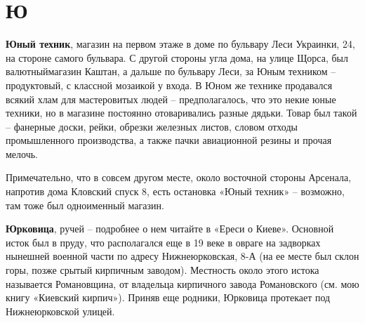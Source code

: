 \chapter*{Ю}


\textbf{Юный техник}, магазин на первом этаже в доме по бульвару Леси Украинки, 24, на стороне самого бульвара. С другой стороны угла дома, на улице Щорса, был валютныймагазин Каштан, а дальше по бульвару Леси, за Юным техником – продуктовый, с классной мозаикой у входа. В Юном же технике продавался всякий хлам для мастеровитых людей – предполагалось, что это некие юные техники, но в магазине постоянно отоваривались разные дядьки. Товар был такой – фанерные доски, рейки, обрезки железных листов, словом отходы промышленного производства, а также пачки авиационной резины и прочая мелочь.

Примечательно, что в совсем другом месте, около восточной стороны Арсенала, напротив дома Кловский спуск 8, есть остановка «Юный техник» – возможно, там тоже был одноименный магазин.\\

\medskip

\textbf{Юрковица}, ручей – подробнее о нем читайте в «Ереси о Киеве». Основной исток был в пруду, что располагался еще в 19 веке в овраге на задворках нынешней военной части по адресу Нижнеюрковская, 8-А (на ее месте был склон горы, позже срытый кирпичным заводом). Местность около этого истока называется Романовщина, от владельца кирпичного завода Романовского (см. мою книгу «Киевский кирпич»). Приняв еще родники, Юрковица протекает под Нижнеюрковской улицей.
